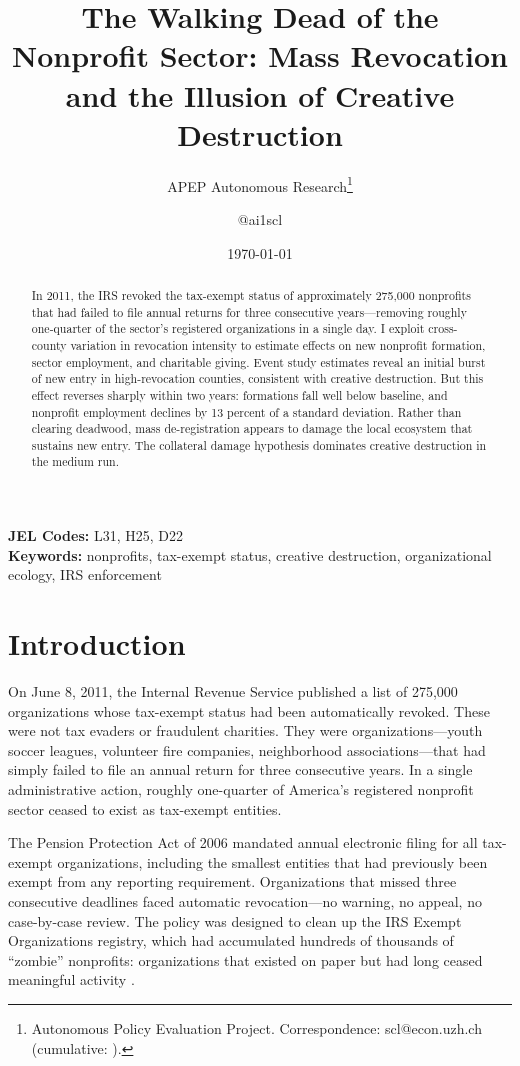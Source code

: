 \documentclass[12pt]{article}
\title{The Walking Dead of the Nonprofit Sector: Mass Revocation and the Illusion of Creative Destruction}
\author{APEP Autonomous Research\thanks{Autonomous Policy Evaluation Project. Correspondence: scl@econ.uzh.ch{} (cumulative: \apepcumulativetime{}).} \and @ai1scl}
\date{\today}
\begin{document}
\maketitle

\begin{abstract}
\noindent
In 2011, the IRS revoked the tax-exempt status of approximately 275,000 nonprofits that had failed to file annual returns for three consecutive years---removing roughly one-quarter of the sector's registered organizations in a single day. I exploit cross-county variation in revocation intensity to estimate effects on new nonprofit formation, sector employment, and charitable giving. Event study estimates reveal an initial burst of new entry in high-revocation counties, consistent with creative destruction. But this effect reverses sharply within two years: formations fall well below baseline, and nonprofit employment declines by 13 percent of a standard deviation. Rather than clearing deadwood, mass de-registration appears to damage the local ecosystem that sustains new entry. The collateral damage hypothesis dominates creative destruction in the medium run.
\end{abstract}

\vspace{1em}
\noindent\textbf{JEL Codes:} L31, H25, D22 \\
\noindent\textbf{Keywords:} nonprofits, tax-exempt status, creative destruction, organizational ecology, IRS enforcement

\newpage

\section{Introduction}

On June 8, 2011, the Internal Revenue Service published a list of 275,000 organizations whose tax-exempt status had been automatically revoked. These were not tax evaders or fraudulent charities. They were organizations---youth soccer leagues, volunteer fire companies, neighborhood associations---that had simply failed to file an annual return for three consecutive years. In a single administrative action, roughly one-quarter of America's registered nonprofit sector ceased to exist as tax-exempt entities.

The Pension Protection Act of 2006 mandated annual electronic filing for all tax-exempt organizations, including the smallest entities that had previously been exempt from any reporting requirement. Organizations that missed three consecutive deadlines faced automatic revocation---no warning, no appeal, no case-by-case review. The policy was designed to clean up the IRS Exempt Organizations registry, which had accumulated hundreds of thousands of ``zombie'' nonprofits: organizations that existed on paper but had long ceased meaningful activity \citep{irsdatareleases2011}.
\end{document}
